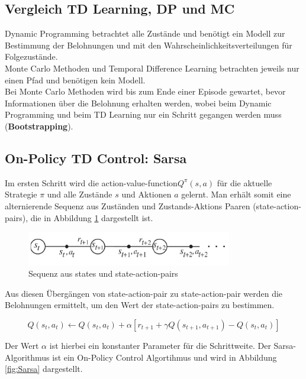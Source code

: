 \documentclass[10pt]{scrartcl}
\begin{document}
\subsection{Vergleich TD Learning, DP und MC}
Dynamic Programming betrachtet alle Zustände und benötigt ein Modell zur Bestimmung der Belohnungen und mit den Wahrscheinlichkeitsverteilungen für Folgezustände.\\
Monte Carlo Methoden und Temporal Difference Learning betrachten jeweils nur einen Pfad und benötigen kein Modell. \\
Bei Monte Carlo Methoden wird bis zum Ende einer Episode gewartet, bevor Informationen über die Belohnung erhalten werden, wobei beim Dynamic Programming und beim TD Learning nur ein Schritt gegangen werden muss (\textbf{Bootstrapping}).

\subsection{On-Policy TD Control: Sarsa}

Im ersten Schritt wird die \glqq action-value-function\grqq\xspace $Q^{\pi}(s,a)$ für die aktuelle Strategie $\pi$ und alle Zustände $s$ und Aktionen $a$ gelernt. Man erhält somit eine alternierende Sequenz aus Zuständen und Zustands-Aktions Paaren (state-action-pairs), die in Abbildung \ref{fig:SA-Pairs} dargestellt ist.

\begin{figure}[htbp]
	\centering	\includegraphics[width=0.8\textwidth]{Bilder/OnPolicy.png}
	\caption{Sequenz aus states und state-action-pairs}
	\label{fig:SA-Pairs}
\end{figure}

Aus diesen Übergängen von state-action-pair zu state-action-pair werden die Belohnungen ermittelt, um den Wert der state-action-pairs zu bestimmen.

\begin{equation}
Q(s_{t},a_{t}) \leftarrow Q(s_{t},a_{t}) + \alpha [r_{t+1} + \gamma Q(s_{t+1},a_{t+1}) - Q(s_{t},a_{t})]
\end{equation}

Der Wert $\alpha$ ist hierbei ein konstanter Parameter für die Schrittweite. Der Sarsa-Algorithmus ist ein On-Policy Control Algortihmus und wird in Abbildung \ref{fig:Sarsa} dargestellt.
\end{document}
